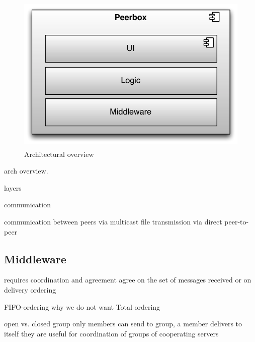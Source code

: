 



\begin{figure}[htbp]
    \centering
        \includegraphics[height=3in]{figures/archOverview.pdf}
    \caption{Architectural overview}
    \label{fig:figures_archOverview}
\end{figure}


arch overview. 

layers

communication

communication between peers via multicast 
file transmission via direct peer-to-peer




\subsection{Middleware}

requires coordination and 
agreement
agree on the set of messages received or on delivery 
ordering

FIFO-ordering
why we do not want Total ordering


open vs. closed group 
 only members can send to group, a member delivers to itself 
 they are useful for coordination of groups of cooperating servers

